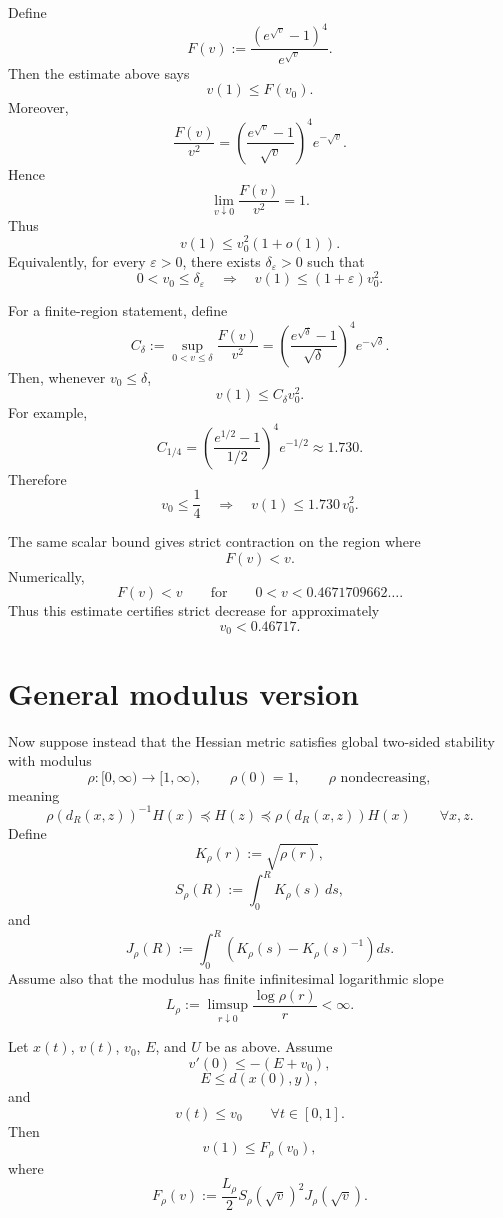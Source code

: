 \documentclass[11pt]{article}
\begin{document}
Define
\[
    F(v)
    :=
    \frac{(e^{\sqrt v}-1)^4}{e^{\sqrt v}}.
\]
Then the estimate above says
\[
    v(1)\le F(v_0).
\]
Moreover,
\[
    \frac{F(v)}{v^2}
    =
    \left(
        \frac{e^{\sqrt v}-1}{\sqrt v}
    \right)^4
    e^{-\sqrt v}.
\]
Hence
\[
    \lim_{v\downarrow0}\frac{F(v)}{v^2}=1.
\]
Thus
\[
    v(1)\le v_0^2(1+o(1)).
\]
Equivalently, for every \(\varepsilon>0\), there exists \(\delta_\varepsilon>0\) such that
\[
    0<v_0\le \delta_\varepsilon
    \quad\Longrightarrow\quad
    v(1)\le (1+\varepsilon)v_0^2.
\]

For a finite-region statement, define
\[
    C_\delta
    :=
    \sup_{0<v\le\delta}\frac{F(v)}{v^2}
    =
    \left(
        \frac{e^{\sqrt\delta}-1}{\sqrt\delta}
    \right)^4
    e^{-\sqrt\delta}.
\]
Then, whenever \(v_0\le\delta\),
\[
    v(1)\le C_\delta v_0^2.
\]
For example,
\[
    C_{1/4}
    =
    \left(
        \frac{e^{1/2}-1}{1/2}
    \right)^4e^{-1/2}
    \approx 1.730.
\]
Therefore
\[
    v_0\le \frac14
    \quad\Longrightarrow\quad
    v(1)\le 1.730\,v_0^2.
\]

The same scalar bound gives strict contraction on the region where
\[
    F(v)<v.
\]
Numerically,
\[
    F(v)<v
    \qquad\text{for}\qquad
    0<v<0.4671709662\ldots.
\]
Thus this estimate certifies strict decrease for approximately
\[
    v_0<0.46717.
\]

\section{General modulus version}

Now suppose instead that the Hessian metric satisfies global two-sided stability with modulus
\[
    \rho:[0,\infty)\to[1,\infty),
    \qquad
    \rho(0)=1,
    \qquad
    \rho \text{ nondecreasing},
\]
meaning
\[
    \rho(d_R(x,z))^{-1}H(x)
    \preceq
    H(z)
    \preceq
    \rho(d_R(x,z))H(x)
    \qquad
    \forall x,z.
\]
Define
\[
    K_\rho(r):=\sqrt{\rho(r)},
\]
\[
    S_\rho(R):=\int_0^R K_\rho(s)\,ds,
\]
and
\[
    J_\rho(R):=
    \int_0^R
    \left(
        K_\rho(s)-K_\rho(s)^{-1}
    \right)ds.
\]
Assume also that the modulus has finite infinitesimal logarithmic slope
\[
    L_\rho
    :=
    \limsup_{r\downarrow0}
    \frac{\log\rho(r)}{r}
    <\infty.
\]

Let \(x(t)\), \(v(t)\), \(v_0\), \(E\), and \(U\) be as above. Assume
\[
    v'(0)\le -(E+v_0),
\]
\[
    E\le d(x(0),y),
\]
and
\[
    v(t)\le v_0
    \qquad
    \forall t\in[0,1].
\]
Then
\[
    v(1)
    \le
    F_\rho(v_0),
\]
where
\[
    F_\rho(v)
    :=
    \frac{L_\rho}{2}
    S_\rho(\sqrt v)^2
    J_\rho(\sqrt v).
\]
\end{document}
